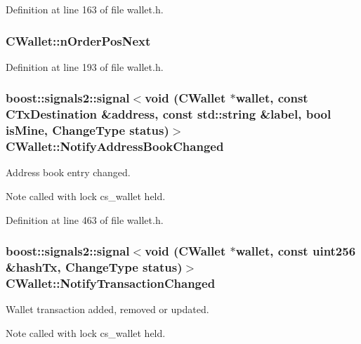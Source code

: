 Definition at line 163 of file wallet.\+h.

\hypertarget{class_c_wallet_af56cb17b19742506fc8d9449fc60884e}{}
\subsubsection[{n\+Order\+Pos\+Next}]{ C\+Wallet\+::n\+Order\+Pos\+Next}\label{class_c_wallet_af56cb17b19742506fc8d9449fc60884e}


Definition at line 193 of file wallet.\+h.

\hypertarget{class_c_wallet_a86f4563888686dd3dbdee406f74f8d3f}{}
\subsubsection[{Notify\+Address\+Book\+Changed}]{\setlength{\rightskip}{0pt plus 5cm}boost\+::signals2\+::signal$<$void ({\bf C\+Wallet} $\ast$wallet, const {\bf C\+Tx\+Destination} \&address, const std\+::string \&label, bool is\+Mine, {\bf Change\+Type} status)$>$ C\+Wallet\+::\+Notify\+Address\+Book\+Changed}\label{class_c_wallet_a86f4563888686dd3dbdee406f74f8d3f}
Address book entry changed. \begin{DoxyNote}{Note}
called with lock cs\+\_\+wallet held. 
\end{DoxyNote}


Definition at line 463 of file wallet.\+h.

\hypertarget{class_c_wallet_acd26616ef558afbc5bc62d72603957fc}{}
\subsubsection[{Notify\+Transaction\+Changed}]{\setlength{\rightskip}{0pt plus 5cm}boost\+::signals2\+::signal$<$void ({\bf C\+Wallet} $\ast$wallet, const {\bf uint256} \&hash\+Tx, {\bf Change\+Type} status)$>$ C\+Wallet\+::\+Notify\+Transaction\+Changed}\label{class_c_wallet_acd26616ef558afbc5bc62d72603957fc}
Wallet transaction added, removed or updated. \begin{DoxyNote}{Note}
called with lock cs\+\_\+wallet held. 
\end{DoxyNote}


